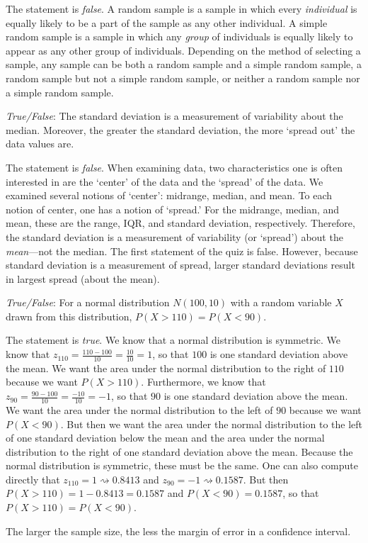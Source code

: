 \documentclass[11pt,letterpaper]{article}
\newcommand{\squiggle}{\rightsquigarrow}
\begin{document}
\sol The statement is \textit{false}. A random sample is a sample in which every \textit{individual} is equally likely to be a part of the sample as any other individual. A simple random sample is a sample in which any \textit{group} of individuals is equally likely to appear as any other group of individuals. Depending on the method of selecting a sample, any sample can be both a random sample and a simple random sample, a random sample but not a simple random sample, or neither a random sample nor a simple random sample. \pvspace{1.3cm}



\quizsol \textit{True/False}: The standard deviation is a measurement of variability about the median. Moreover, the greater the standard deviation, the more `spread out' the data values are. \pspace

\sol The statement is \textit{false}. When examining data, two characteristics one is often interested in are the `center' of the data and the `spread' of the data. We examined several notions of `center': midrange, median, and mean. To each notion of center, one has a notion of `spread.' For the midrange, median, and mean, these are the range, IQR, and standard deviation, respectively. Therefore, the standard deviation is a measurement of variability (or `spread') about the \textit{mean}---not the median. The first statement of the quiz is false. However, because standard deviation is a measurement of spread, larger standard deviations result in largest spread (about the mean). \pvspace{1.3cm}



\quizsol \textit{True/False}: For a normal distribution $N(100, 10)$ with a random variable $X$ drawn from this distribution, $P(X > 110)= P(X < 90)$. \pspace

\sol The statement is \textit{true}. We know that a normal distribution is symmetric. We know that $z_{110}= \frac{110 - 100}{10}= \frac{10}{10}= 1$, so that $100$ is one standard deviation above the mean. We want the area under the normal distribution to the right of $110$ because we want $P(X > 110)$. Furthermore, we know that $z_{90}= \frac{90 - 100}{10}= \frac{-10}{10}= -1$, so that $90$ is one standard deviation above the mean. We want the area under the normal distribution to the left of $90$ because we want $P(X < 90)$. But then we want the area under the normal distribution to the left of one standard deviation below the mean and the area under the normal distribution to the right of one standard deviation above the mean. Because the normal distribution is symmetric, these must be the same. One can also compute directly that $z_{110}= 1 \squiggle 0.8413$ and $z_{90}= -1 \squiggle 0.1587$. But then $P(X > 110)= 1 - 0.8413= 0.1587$ and $P(X < 90)= 0.1587$, so that $P(X > 110)= P(X < 90)$. 




The larger the sample size, the less the margin of error in a confidence interval. 
\end{document}
